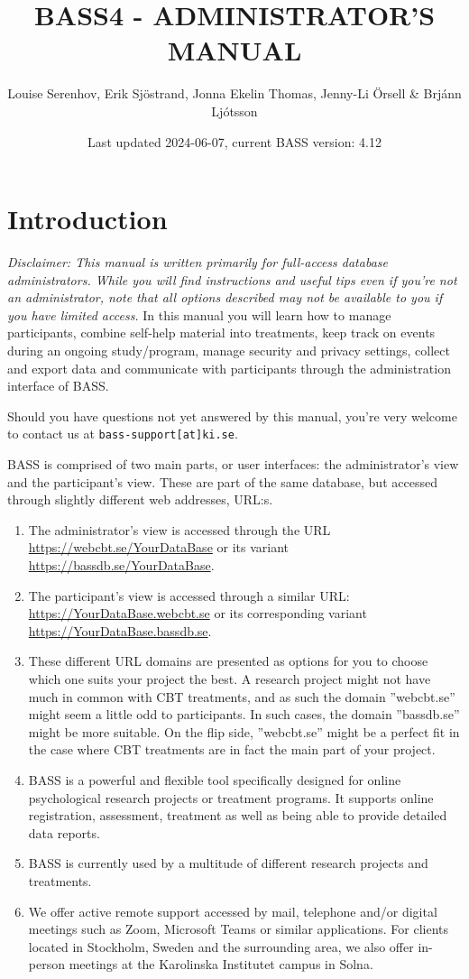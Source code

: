 \documentclass[
]{book}
\title{BASS4 - ADMINISTRATOR'S MANUAL}
\author{Louise Serenhov, Erik Sjöstrand, Jonna Ekelin Thomas, Jenny-Li Örsell \& Brjánn Ljótsson}
\date{Last updated 2024-06-07, current BASS version: 4.12}
\providecommand{\tightlist}{%
  \setlength{\itemsep}{0pt}\setlength{\parskip}{0pt}}
\begin{document}
\maketitle

{
\setcounter{tocdepth}{1}
\tableofcontents
}
\chapter{Introduction}\label{introduction}

\emph{Disclaimer: This manual is written primarily for full-access database administrators. While you will find instructions and useful tips even if you're not an administrator, note that all options described may not be available to you if you have limited access.}
In this manual you will learn how to manage participants, combine self-help material into treatments, keep track on events during an ongoing study/program, manage security and privacy settings, collect and export data and communicate with participants through the administration interface of BASS.

Should you have questions not yet answered by this manual, you're very welcome to contact us at \texttt{bass-support{[}at{]}ki.se}.

BASS is comprised of two main parts, or user interfaces: the administrator's view and the participant's view. These are part of the same database, but accessed through slightly different web addresses, URL:s.

\begin{enumerate}
\def\labelenumi{\arabic{enumi}.}
\tightlist
\item
  The administrator's view is accessed through the URL \url{https://webcbt.se/YourDataBase} or its variant \url{https://bassdb.se/YourDataBase}.
\item
  The participant's view is accessed through a similar URL: \url{https://YourDataBase.webcbt.se} or its corresponding variant \url{https://YourDataBase.bassdb.se}.
\item
  These different URL domains are presented as options for you to choose which one suits your project the best. A research project might not have much in common with CBT treatments, and as such the domain ''webcbt.se'' might seem a little odd to participants. In such cases, the domain ''bassdb.se'' might be more suitable. On the flip side, ''webcbt.se'' might be a perfect fit in the case where CBT treatments are in fact the main part of your project.
\item
  BASS is a powerful and flexible tool specifically designed for online psychological research projects or treatment programs. It supports online registration, assessment, treatment as well as being able to provide detailed data reports.
\item
  BASS is currently used by a multitude of different research projects and treatments.
\item
  We offer active remote support accessed by mail, telephone and/or digital meetings such as Zoom, Microsoft Teams or similar applications. For clients located in Stockholm, Sweden and the surrounding area, we also offer in-person meetings at the Karolinska Institutet campus in Solna.
\end{enumerate}
\end{document}
